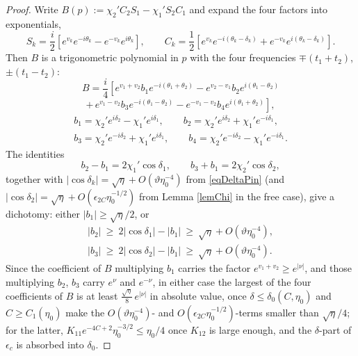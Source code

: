 \documentclass[10pt,a4paper]{amsart}
\def\d{\delta}
\begin{document}
\begin{proof}
Write $B(p):=\chi_2'C_2S_1-\chi_1'S_2C_1$ and expand the four factors into exponentials,
$$S_k=\frac i2\left[e^{v_k}e^{-i\theta_k}-e^{-v_k}e^{i\theta_k}\right],\qquad
C_k=\frac 12\left[e^{v_k}e^{-i(\theta_k-\d_k)}+e^{-v_k}e^{i(\theta_k-\d_k)}\right].$$
Then $B$ is a trigonometric polynomial in $p$ with the four frequencies $\mp(t_1+t_2)$, $\pm(t_1-t_2)$:
$$B=\frac i4\left[e^{v_1+v_2}b_1e^{-i(\theta_1+\theta_2)}-e^{v_2-v_1}b_2e^{i(\theta_1-\theta_2)}\right.$$
$$\left.+\,e^{v_1-v_2}b_3e^{-i(\theta_1-\theta_2)}-e^{-v_1-v_2}b_4e^{i(\theta_1+\theta_2)}\right],$$
$$\begin{gathered}b_1=\chi_2'e^{i\d_2}-\chi_1'e^{i\d_1},\qquad b_2=\chi_2'e^{i\d_2}+\chi_1'e^{-i\d_1},\\
b_3=\chi_2'e^{-i\d_2}+\chi_1'e^{i\d_1},\qquad b_4=\chi_2'e^{-i\d_2}-\chi_1'e^{-i\d_1}.\end{gathered}$$
The identities
$$b_2-b_1=2\chi_1'\cos\d_1,\qquad b_3+b_1=2\chi_2'\cos\d_2,$$
together with $|\cos\d_k|=\sqrt\eta+O(\vartheta\eta_0^{-4})$ from \eqref{eqDeltaPin} (and $|\cos\d_2|=\sqrt\eta+O(\epsilon_{2C}\eta_0^{-1/2})$ from Lemma \ref{lemChi} in the free case), give a dichotomy: either $|b_1|\geq\sqrt\eta/2$, or
$$\begin{gathered}|b_2|\ \geq\ 2|\cos\d_1|-|b_1|\ \geq\ \sqrt\eta+O(\vartheta\eta_0^{-4}),\\
|b_3|\ \geq\ 2|\cos\d_2|-|b_1|\ \geq\ \sqrt\eta+O(\vartheta\eta_0^{-4}).\end{gathered}$$
Since the coefficient of $B$ multiplying $b_1$ carries the factor $e^{v_1+v_2}\geq e^{|\nu|}$, and those multiplying $b_2$, $b_3$ carry $e^{\nu}$ and $e^{-\nu}$, in either case the largest of the four coefficients of $B$ is at least $\frac{\sqrt\eta}{8}\,e^{|\nu|}$ in absolute value, once $\d\leq\d_0(C,\eta_0)$ and $C\geq C_1(\eta_0)$ make the $O(\vartheta\eta_0^{-4})$- and $O(\epsilon_{2C}\eta_0^{-1/2})$-terms smaller than $\sqrt\eta/4$; for the latter, $K_{11}e^{-4C+2}\eta_0^{-3/2}\leq\eta_0/4$ once $K_{12}$ is large enough, and the $\d$-part of $\epsilon_c$ is absorbed into $\d_0$.


\end{proof}
\end{document}
